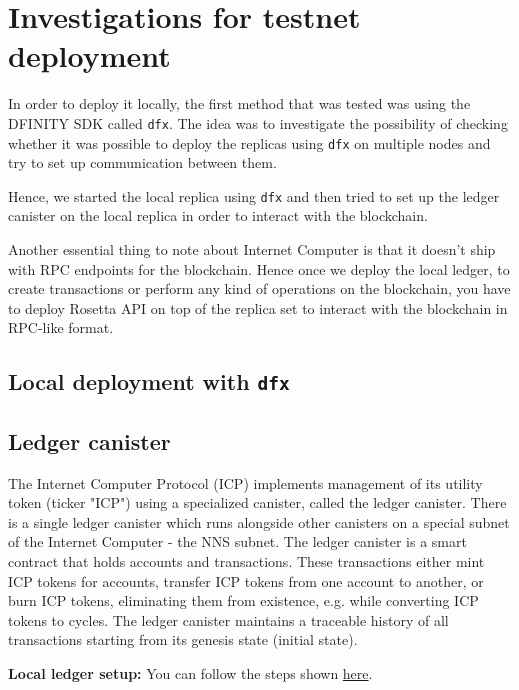 \chapter{Investigations for testnet deployment}
\label{chap:chapterfour}

In order to deploy it locally, the first method that was tested was using the DFINITY SDK called \texttt{dfx}. The idea was to 
investigate the possibility of checking whether it was possible to deploy the replicas using \texttt{dfx} on multiple nodes and 
try to set up communication between them.

Hence, we started the local replica using \texttt{dfx} and then tried to set up the ledger canister on the local replica in 
order to interact with the blockchain.

Another essential thing to note about Internet Computer is that it doesn't ship with RPC endpoints for the blockchain. Hence 
once we deploy the local ledger, to create transactions or perform any kind of operations on the blockchain, you have to deploy 
Rosetta API on top of the replica set to interact with the blockchain in RPC-like format.

\section{Local deployment with \texttt{dfx}}

\section{Ledger canister}

The Internet Computer Protocol (ICP) implements management of its utility token (ticker "ICP") using a specialized canister, 
called the ledger canister. There is a single ledger canister which runs alongside other canisters on a special subnet of the 
Internet Computer - the NNS subnet. The ledger canister is a smart contract that holds accounts and transactions. These 
transactions either mint ICP tokens for accounts, transfer ICP tokens from one account to another, or burn ICP tokens, 
eliminating them from existence, e.g. while converting ICP tokens to cycles. The ledger canister maintains a traceable history 
of all transactions starting from its genesis state (initial state).

\textbf{Local ledger setup:} You can follow the steps shown \href{https://internetcomputer.org/docs/current/developer-docs/integrations/ledger/ledger-local-setup}{here}.

